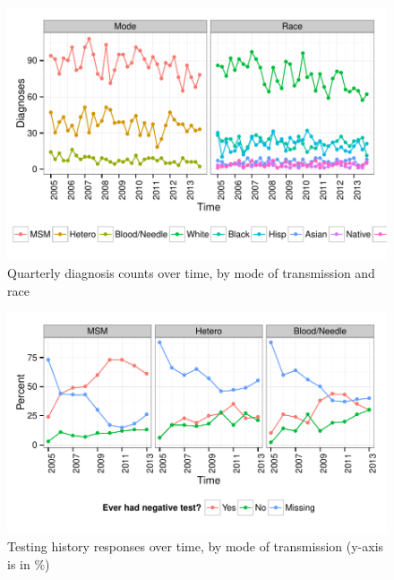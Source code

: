 \documentclass{article}\usepackage[]{graphicx}\usepackage[]{color}
\makeatletter
\def\maxwidth{ %
  \ifdim\Gin@nat@width>\linewidth
    \linewidth
  \else
    \Gin@nat@width
  \fi
}
\newenvironment{knitrout}{}{} %
\makeatother
\begin{document}
\begin{knitrout}\footnotesize
{}\color{fgcolor}\begin{figure}[!h]


{\centering \includegraphics[width=\maxwidth]{figure/minimal-plot_diagnoses_subgroup} 

}

\caption[Quarterly diagnosis counts over time, by mode of transmission and race]{Quarterly diagnosis counts over time, by mode of transmission and race\label{fig:plot_diagnoses_subgroup}}
\end{figure}


\end{knitrout}

\begin{knitrout}\footnotesize
{}\color{fgcolor}\begin{figure}[!h]


{\centering \includegraphics[width=\maxwidth]{figure/minimal-plot_modetime} 

}

\caption[Testing history responses over time, by mode of transmission (y-axis is in \%)]{Testing history responses over time, by mode of transmission (y-axis is in \%)\label{fig:plot_modetime}}
\end{figure}


\end{knitrout}
\end{document}
